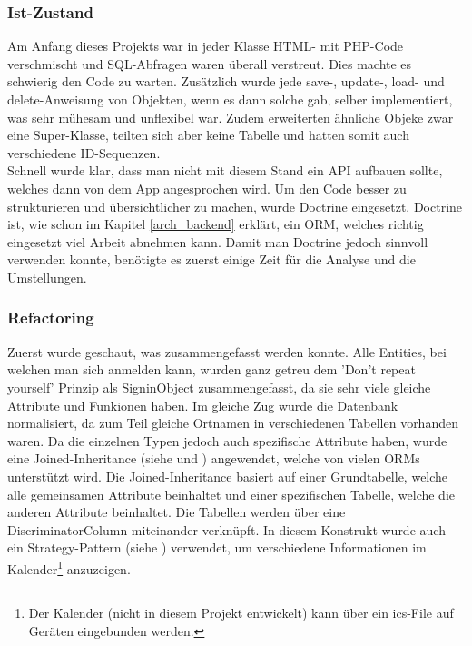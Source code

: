 \subsubsection{Ist-Zustand}
Am Anfang dieses Projekts war in jeder Klasse HTML- mit PHP-Code verschmischt und SQL-Abfragen waren überall verstreut. Dies machte es schwierig den Code zu warten. Zusätzlich wurde jede save-, update-, load- und delete-Anweisung von Objekten, wenn es dann solche gab, selber implementiert, was sehr mühesam und unflexibel war. Zudem erweiterten ähnliche Objeke zwar eine Super-Klasse, teilten sich aber keine Tabelle und hatten somit auch verschiedene ID-Sequenzen.\\

Schnell wurde klar, dass man nicht mit diesem Stand ein API aufbauen sollte, welches dann von dem App angesprochen wird. Um den Code besser zu strukturieren und übersichtlicher zu machen, wurde Doctrine eingesetzt. Doctrine ist, wie schon im Kapitel \ref{arch_backend} erklärt, ein ORM, welches richtig eingesetzt viel Arbeit abnehmen kann. Damit man Doctrine jedoch sinnvoll verwenden konnte, benötigte es zuerst einige Zeit für die Analyse und die Umstellungen.

\subsubsection{Refactoring}
Zuerst wurde geschaut, was zusammengefasst werden konnte. Alle Entities, bei welchen man sich anmelden kann, wurden ganz getreu dem 'Don’t repeat yourself' Prinzip als SigninObject zusammengefasst, da sie sehr viele gleiche Attribute und Funkionen haben. Im gleiche Zug wurde die Datenbank normalisiert, da zum Teil gleiche Ortnamen in verschiedenen Tabellen vorhanden waren. Da die einzelnen Typen jedoch auch spezifische Attribute haben, wurde eine Joined-Inheritance (siehe \cite{inheritance_java} und \cite{inheritance_doctrine}) angewendet, welche von vielen ORMs unterstützt wird. Die Joined-Inheritance basiert auf einer Grundtabelle, welche alle gemeinsamen Attribute beinhaltet und einer spezifischen Tabelle, welche die anderen Attribute beinhaltet. Die Tabellen werden über eine DiscriminatorColumn miteinander verknüpft. In diesem Konstrukt wurde auch ein Strategy-Pattern (siehe \cite{gof_book}) verwendet, um verschiedene Informationen im Kalender\footnote{Der Kalender (nicht in diesem Projekt entwickelt) kann über ein ics-File auf Geräten eingebunden werden.} anzuzeigen.\\

